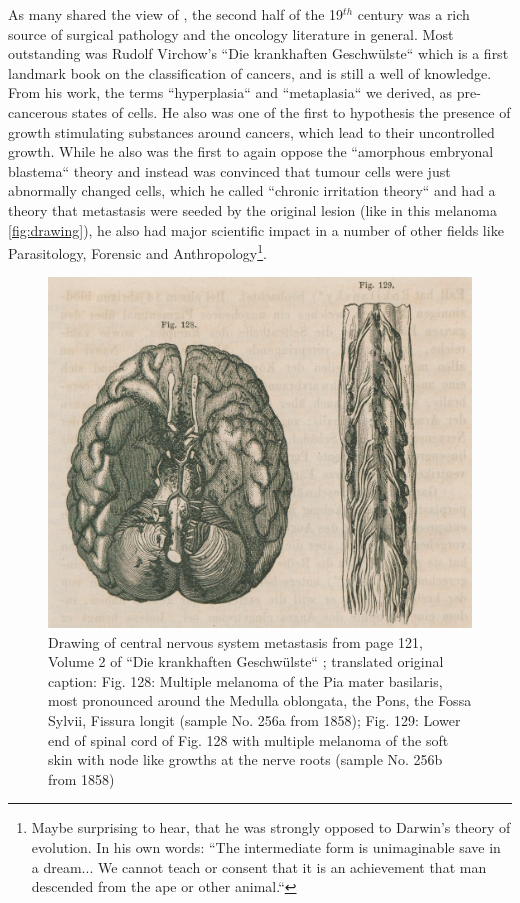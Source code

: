 As many shared the view of \citeauthor{Bennett1849}, the second half of the 19$^{th}$ century was a rich source of surgical pathology and the oncology literature in general. Most outstanding was Rudolf Virchow's ``Die krankhaften Geschw\"ulste`` \cite{Virchow1863} which is a first landmark book on the classification of cancers, and is still a well of knowledge. From his work, the terms ``hyperplasia`` and ``metaplasia``  we derived, as pre-cancerous states of cells. He also was one of the first to hypothesis the presence of growth stimulating substances around cancers, which lead to their uncontrolled growth. While he also was the first to again oppose the ``amorphous embryonal blastema`` theory and instead was convinced that tumour cells were just abnormally changed cells, which he called ``chronic irritation theory`` and had a theory that metastasis were seeded by the original lesion (like in this melanoma \autoref{fig:drawing}), he also had major scientific impact in a number of other fields like Parasitology, Forensic and Anthropology\footnote{Maybe surprising to hear, that he was strongly opposed to Darwin's theory of evolution. In his own words: ``The intermediate form is unimaginable save in a dream... We cannot teach or consent that it is an achievement that man descended from the ape or other animal.``}.

\begin{figure}[!ht]
\centering
\includegraphics[width=.95\linewidth]{Figures/drawingMelaMeta}
\caption[Drawing of central nervous system metastasis]{Drawing of central nervous system metastasis from page 121, Volume 2 of ``Die krankhaften Geschw\"ulste`` \protect\textcite{Virchow1863}; translated original caption: Fig. 128: Multiple melanoma of the Pia mater basilaris, most pronounced around the Medulla oblongata, the Pons, the Fossa Sylvii, Fissura longit (sample No. 256a from 1858); Fig. 129: Lower end of spinal cord of Fig. 128 with multiple melanoma of the soft skin with node like growths at the nerve roots (sample No. 256b from 1858)}\label{fig:drawing}
\end{figure}

